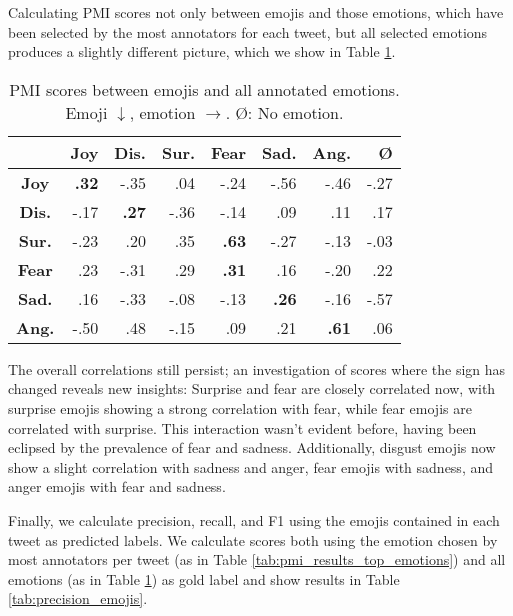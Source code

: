 \documentclass[10pt, a4paper]{article}
\begin{document}
Calculating PMI scores not only between emojis and those emotions, which have been selected by the most annotators for each tweet, but all selected emotions produces a slightly different picture, which we show in Table \ref{tab:pmi_results_all_emotions}.

\begin{table}[]
\centering
\begin{tabular}{c | r | r | r | r | r | r | r}
 & \textbf{Joy} & \textbf{Dis.} & \textbf{Sur.} & \textbf{Fear} & \textbf{Sad.} & \textbf{Ang.} & \textbf{\O} \\\hline
\textbf{Joy} & \textbf{.32} & -.35 & .04 & -.24 & -.56 & -.46 & -.27 \\
\textbf{Dis.} & -.17 & \textbf{.27} & -.36 & -.14 & .09 & .11 & .17 \\
\textbf{Sur.} & -.23 & .20 & .35 & \textbf{.63} & -.27 & -.13 & -.03 \\
\textbf{Fear} & .23 & -.31 & .29 & \textbf{.31} & .16 & -.20 & .22 \\
\textbf{Sad.} & .16 & -.33 & -.08 & -.13 & \textbf{.26} & -.16 & -.57 \\
\textbf{Ang.} & -.50 & .48 & -.15 & .09 & .21 & \textbf{.61} & .06
\end{tabular}
\caption{PMI scores between emojis and all annotated emotions. Emoji $\downarrow$, emotion $\rightarrow$. \O: No emotion.}
\label{tab:pmi_results_all_emotions}
\end{table}

The overall correlations still persist; an investigation of scores where the sign has changed reveals new insights: Surprise and fear are closely correlated now, with surprise emojis showing a strong correlation with fear, while fear emojis are correlated with surprise. This interaction wasn't evident before, having been eclipsed by the prevalence of fear and sadness. Additionally, disgust emojis now show a slight correlation with sadness and anger, fear emojis with sadness, and anger emojis with fear and sadness.

Finally, we calculate precision, recall, and F1 using the emojis contained in each tweet as predicted labels. We calculate scores both using the emotion chosen by most annotators per tweet (as in Table \ref{tab:pmi_results_top_emotions}) and all emotions (as in Table \ref{tab:pmi_results_all_emotions}) as gold label and show results in Table \ref{tab:precision_emojis}.
\end{document}
